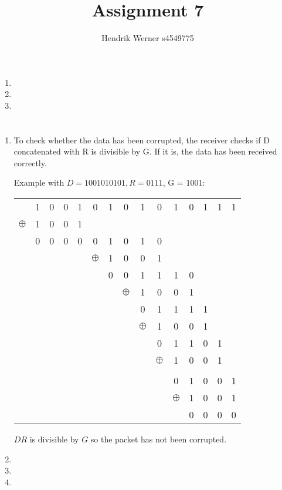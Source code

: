 \documentclass[12pt, a4paper]{article}
\title{Assignment 7}
\author{Hendrik Werner s4549775}
\begin{document}
\maketitle

\section{} %
\begin{enumerate}[a]
	\item %
	\item %
	\item %
\end{enumerate}

\section{} %

\section{} %
\begin{enumerate}[a]
	\item %
	To check whether the data has been corrupted, the receiver checks if D concatenated with R is divisible by G. If it is, the data has been received correctly.

	Example with $D = 1001010101, R = 0111$, G = 1001:

	\begin{tabular}{ccccccccccccccc}
		& 1 & 0 & 0 & 1 & 0 & 1 & 0 & 1 & 0 & 1 & 0 & 1 & 1 & 1\\
		$\oplus$ & 1 & 0 & 0 & 1\\\cline{2-5}
		& 0 & 0 & 0 & 0 & 0 & 1 & 0 & 1 & 0\\
		&&&&& $\oplus$ & 1 & 0 & 0 & 1\\\cline{7-10}
		&&&&&& 0 & 0 & 1 & 1 & 1 & 0\\
		&&&&&&& $\oplus$ & 1 & 0 & 0 & 1\\\cline{9-12}
		&&&&&&&& 0 & 1 & 1 & 1 & 1\\
		&&&&&&&& $\oplus$ & 1 & 0 & 0 & 1\\\cline{10-13}
		&&&&&&&&& 0 & 1 & 1 & 0 & 1\\
		&&&&&&&&& $\oplus$ & 1 & 0 & 0 & 1\\\cline{11-14}
		&&&&&&&&&& \\
		&&&&&&&&&& 0 & 1 & 0 & 0 & 1\\
		&&&&&&&&&& $\oplus$ & 1 & 0 & 0 & 1\\\cline{12-15}
		&&&&&&&&&&& 0 & 0 & 0 & 0\\
	\end{tabular}

	$DR$ is divisible by $G$ so the packet has not been corrupted.
	\item %
	\item %
	\item %
\end{enumerate}
\end{document}
